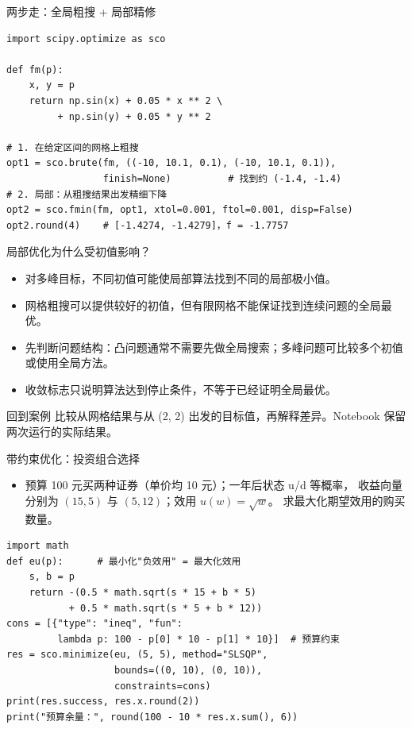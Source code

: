 \documentclass[9pt]{ctexbeamer}
\begin{document}
\begin{frame}[fragile]{两步走：全局粗搜 + 局部精修}
	\begin{lstlisting}
import scipy.optimize as sco

def fm(p):
    x, y = p
    return np.sin(x) + 0.05 * x ** 2 \
         + np.sin(y) + 0.05 * y ** 2

# 1. 在给定区间的网格上粗搜
opt1 = sco.brute(fm, ((-10, 10.1, 0.1), (-10, 10.1, 0.1)),
                 finish=None)          # 找到约 (-1.4, -1.4)
# 2. 局部：从粗搜结果出发精细下降
opt2 = sco.fmin(fm, opt1, xtol=0.001, ftol=0.001, disp=False)
opt2.round(4)    # [-1.4274, -1.4279]，f = -1.7757
\end{lstlisting}
\end{frame}

\begin{frame}{局部优化为什么受初值影响？}
\begin{itemize}
\item 对多峰目标，不同初值可能使局部算法找到不同的局部极小值。
\item 网格粗搜可以提供较好的初值，但有限网格不能保证找到连续问题的全局最优。
\item 先判断问题结构：凸问题通常不需要先做全局搜索；多峰问题可比较多个初值或使用全局方法。
\item 收敛标志只说明算法达到停止条件，不等于已经证明全局最优。
\end{itemize}
\begin{block}{回到案例}
比较从网格结果与从 (2, 2) 出发的目标值，再解释差异。Notebook 保留两次运行的实际结果。
\end{block}
\end{frame}

\begin{frame}[fragile]{带约束优化：投资组合选择}
	\begin{itemize}
		\item 预算 100 元买两种证券（单价均 10 元）；一年后状态 u/d 等概率，
			收益向量分别为 $(15, 5)$ 与 $(5, 12)$；效用 $u(w)=\sqrt{w}$。
			求最大化期望效用的购买数量。
	\end{itemize}
	\begin{lstlisting}
import math
def eu(p):      # 最小化"负效用" = 最大化效用
    s, b = p
    return -(0.5 * math.sqrt(s * 15 + b * 5)
           + 0.5 * math.sqrt(s * 5 + b * 12))
cons = [{"type": "ineq", "fun":
         lambda p: 100 - p[0] * 10 - p[1] * 10}]  # 预算约束
res = sco.minimize(eu, (5, 5), method="SLSQP",
                   bounds=((0, 10), (0, 10)),
                   constraints=cons)
print(res.success, res.x.round(2))
print("预算余量：", round(100 - 10 * res.x.sum(), 6))
\end{lstlisting}
\end{frame}
\end{document}
